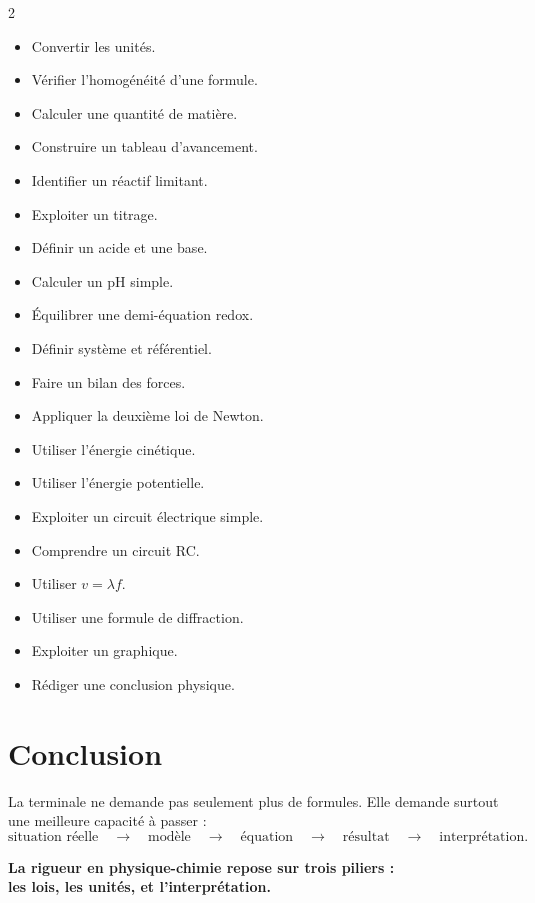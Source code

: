 \documentclass[11pt,a4paper]{article}
\newcommand{\casevide}{\ding{113}}
\begin{document}
\begin{multicols}{2}
\begin{itemize}
  \item[\casevide] Convertir les unités.
  \item[\casevide] Vérifier l'homogénéité d'une formule.
  \item[\casevide] Calculer une quantité de matière.
  \item[\casevide] Construire un tableau d'avancement.
  \item[\casevide] Identifier un réactif limitant.
  \item[\casevide] Exploiter un titrage.
  \item[\casevide] Définir un acide et une base.
  \item[\casevide] Calculer un pH simple.
  \item[\casevide] Équilibrer une demi-équation redox.
  \item[\casevide] Définir système et référentiel.
  \item[\casevide] Faire un bilan des forces.
  \item[\casevide] Appliquer la deuxième loi de Newton.
  \item[\casevide] Utiliser l'énergie cinétique.
  \item[\casevide] Utiliser l'énergie potentielle.
  \item[\casevide] Exploiter un circuit électrique simple.
  \item[\casevide] Comprendre un circuit RC.
  \item[\casevide] Utiliser $v=\lambda f$.
  \item[\casevide] Utiliser une formule de diffraction.
  \item[\casevide] Exploiter un graphique.
  \item[\casevide] Rédiger une conclusion physique.
\end{itemize}
\end{multicols}

\section{Conclusion}

\begin{alerte}
La terminale ne demande pas seulement plus de formules.  
Elle demande surtout une meilleure capacité à passer :
\[
\text{situation réelle}
\quad \longrightarrow \quad
\text{modèle}
\quad \longrightarrow \quad
\text{équation}
\quad \longrightarrow \quad
\text{résultat}
\quad \longrightarrow \quad
\text{interprétation}.
\]
\end{alerte}

\begin{center}
\Large
\textbf{La rigueur en physique-chimie repose sur trois piliers :}\\[1mm]
\textbf{les lois, les unités, et l'interprétation.}
\end{center}
\end{document}

